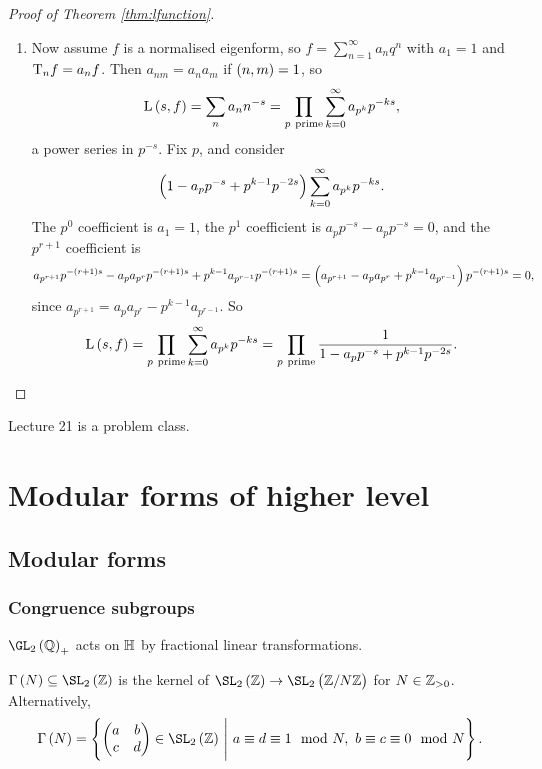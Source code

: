 \begin{proof}[Proof of Theorem \ref{thm:lfunction}]
\begin{enumerate}
\item Now assume $ f $ is a normalised eigenform, so $ f = \sum_{n = 1}^\infty a_nq^n $ with $ a_1 = 1 $ and $ \mathrm{T}_nf = a_nf $. Then $ a_{nm} = a_na_m $ if $ \br{n, m} = 1 $, so
$$ \L\br{s, f} = \sum_n a_nn^{-s} = \prod_{p \ \text{prime}} \sum_{k = 0}^\infty a_{p^k}p^{-ks}, $$
a power series in $ p^{-s} $. Fix $ p $, and consider
$$ \br{1 - a_pp^{-s} + p^{k - 1}p^{-2s}}\sum_{k = 0}^\infty a_{p^k}p^{-ks}. $$
The $ p^0 $ coefficient is $ a_1 = 1 $, the $ p^1 $ coefficient is $ a_pp^{-s} - a_pp^{-s} = 0 $, and the $ p^{r + 1} $ coefficient is
$$ a_{p^{r + 1}}p^{-\br{r + 1}s} - a_pa_{p^r}p^{-\br{r + 1}s} + p^{k - 1}a_{p^{r - 1}}p^{-\br{r + 1}s} = \br{a_{p^{r + 1}} - a_pa_{p^r} + p^{k - 1}a_{p^{r - 1}}}p^{-\br{r + 1}s} = 0, $$
since $ a_{p^{r + 1}} = a_pa_{p^r} - p^{k - 1}a_{p^{r - 1}} $. So
$$ \L\br{s, f} = \prod_{p \ \text{prime}} \sum_{k = 0}^\infty a_{p^k}p^{-ks} = \prod_{p \ \text{prime}} \dfrac{1}{1 - a_pp^{-s} + p^{k - 1}p^{-2s}}. $$
\end{enumerate}
\end{proof}


Lecture 21 is a problem class.

\pagebreak

\section{Modular forms of higher level}

\subsection{Modular forms}

\subsubsection{Congruence subgroups}


$ \GL_2\br{\QQ}_+ $ acts on $ \mathbb{H} $ by fractional linear transformations.

\begin{definition}
$ \Gamma\br{N} \subseteq \SL_2\br{\ZZ} $ is the kernel of $ \SL_2\br{\ZZ} \to \SL_2\br{\ZZ / N\ZZ} $ for $ N \in \mathbb{Z}_{> 0} $. Alternatively,
$$ \Gamma\br{N} = \cbr{\twobytwo{a}{b}{c}{d} \in \SL_2\br{\ZZ} \st a \equiv d \equiv 1 \mod N, \ b \equiv c \equiv 0 \mod N}. $$
\end{definition}

